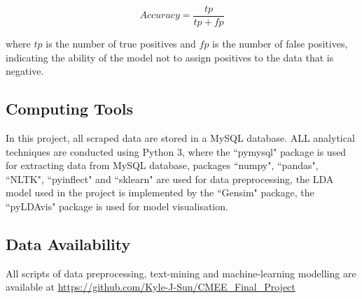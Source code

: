 \begin{equation}
  Accuracy = \frac{tp}{tp + fp}
\end{equation}

where $tp$ is the number of true positives and $fp$ is the number of false positives, indicating the ability of the model not to assign positives to the data that is negative.

\subsection{Computing Tools}

In this project, all scraped data are stored in a MySQL database. ALL analytical techniques are conducted using Python 3, where the ``pymysql" package is used for extracting data from MySQL database, packages ``numpy", ``pandas", ``NLTK", ``pyinflect" and ``sklearn" are used for data preprocessing, the LDA model used in the project is implemented by the ``Gensim" package, the ``pyLDAvis" package is used for model visualisation.

\subsection{Data Availability}

All scripts of data preprocessing, text-mining and machine-learning modelling are available at \url{https://github.com/Kyle-J-Sun/CMEE_Final_Project}
